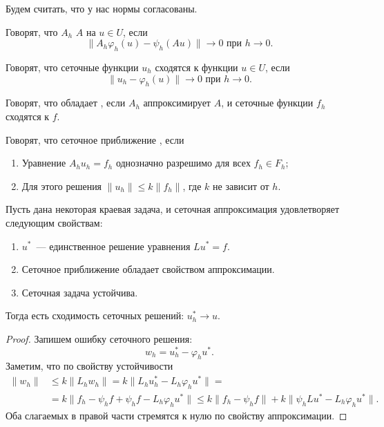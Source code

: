\documentclass{trlnotes}
\begin{document}
    Будем считать, что у нас нормы согласованы.

    \begin{de}
        Говорят, что $A_h$  $A$ на $u \in U$, если 
        \[
            \big\|A_h\varphi_h(u) - \psi_h(Au)\big\| \to 0 \text{ при } h \to 0.
        \]
    \end{de}

    \begin{de}
        Говорят, что сеточные функции $u_h$ сходятся к функции $u \in U$, если 
        \[
            \big\|u_h - \varphi_h(u)\big\| \to 0 \text{ при } h \to 0.
        \]
    \end{de}

    \begin{de}
        Говорят, что  обладает , если $A_h$ аппроксимирует $A$, и сеточные функции $f_h$ сходятся к $f$.
    \end{de}

    \begin{de}  
        Говорят, что сеточное приближение , если
        \begin{enumerate}
            \item Уравнение $A_hu_h = f_h$ однозначно разрешимо для всех $f_h \in F_h$;
            \item Для этого решения $\|u_h\| \leqslant k \|f_h\|$, где $k$ не зависит от $h$.
        \end{enumerate}
    \end{de}

    \begin{thm}
        Пусть дана некоторая краевая задача, и сеточная аппроксимация удовлетворяет следующим свойствам:
        \begin{enumerate}
            \item $u^*$~--- единственное решение уравнения $Lu^* = f$.
            \item Сеточное приближение обладает свойством аппроксимации.
            \item Сеточная задача устойчива.
        \end{enumerate}
        Тогда есть сходимость сеточных решений: $u^*_h \to u$.
        \begin{proof}
            Запишем ошибку сеточного решения:
            \[
                w_h = u_h^* - \varphi_h u^*.
            \]
            Заметим, что по свойству устойчивости
            \begin{align*}
                \|w_h\| &\leqslant k \|L_h w_h\| = k\|L_h u_h^* - L_h \varphi_h u^*\| = \\ &= k\|f_h - \psi_h f + \psi_h f - L_h \varphi_h u^*\| \leqslant k\|f_h - \psi_h f\| + k\|\psi_h L u^* - L_h \varphi_h u^*\|.
            \end{align*}
            Оба слагаемых в правой части стремятся к нулю по свойству аппроксимации.
        \end{proof}
    \end{thm}
\end{document}
